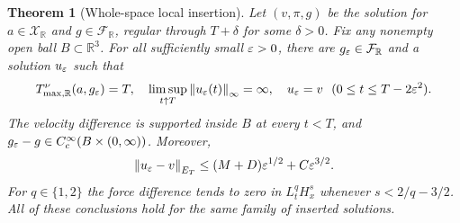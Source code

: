 \documentclass[11pt,a4paper]{article}
\newtheorem{theorem}{Theorem}[section]
\theoremstyle{definition}\newtheorem{definition}[theorem]{Definition}
\theoremstyle{remark}\newtheorem{remark}[theorem]{Remark}
\newcommand{\R}{\mathbb R}\newcommand{\TT}{\mathbb T^3}
\newcommand{\norm}[1]{\left\lVert#1\right\rVert}
\begin{document}
\begin{theorem}[Whole-space local insertion]\label{thm:Rinsert}
Let $(v,\pi,g)$ be the solution for $a\in\mathcal X_{\R}$ and $g\in\mathcal F_{\R}$, regular through $T+\delta$ for some $\delta>0$. Fix any nonempty open ball $B\subset\R^3$. For all sufficiently small $\varepsilon>0$, there are $g_\eps\in\mathcal F_{\R}$ and a solution $u_\varepsilon$ such that
\[
 T^\nu_{\max,\R}(a,g_\eps)=T,\quad
 \limsup_{t\uparrow T}\norm{u_\eps(t)}_\infty=\infty,\quad
 u_\eps=v\ \ (0\le t\le T-2\eps^2).
\]
The velocity difference is supported inside $B$ at every $t<T$, and $g_\varepsilon-g\in C_c^\infty(B\times(0,\infty))$. Moreover,
\begin{equation}\label{eq:REclose}
 \norm{u_\eps-v}_{E_T}\le(M+D)\eps^{1/2}+C\eps^{3/2}.
\end{equation}
For $q\in\{1,2\}$ the force difference tends to zero in $L^q_tH^s_x$ whenever $s<2/q-3/2$. All of these conclusions hold for the same family of inserted solutions.
\end{theorem}
\end{document}
